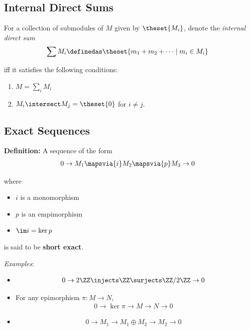 \hypertarget{internal-direct-sums}{%
\subsection{Internal Direct Sums}\label{internal-direct-sums}}

For a collection of submodules of \(M\) given by \(\theset{M_i}\),
denote the \emph{internal direct sum} \begin{align*}
\sum M_i \definedas \theset{m_1 + m_2 + \cdots \mid m_i \in M_i}
\end{align*}

iff it satisfies the following conditions:

\begin{enumerate}
\def\labelenumi{\arabic{enumi}.}
\item
  \(M = \sum_i M_i\)
\item
  \(M_i \intersect M_j = \theset{0}\) for \(i\neq j\).
\end{enumerate}

\hypertarget{exact-sequences}{%
\subsection{Exact Sequences}\label{exact-sequences}}

\textbf{Definition:} A sequence of the form
\begin{align*}
0 \to M_1 \mapsvia{i} M_2 \mapsvia{p} M_3 \to 0
\end{align*}

where

\begin{itemize}
\item
  \(i\) is a monomorphism
\item
  \(p\) is an empimorphism
\item
  \(\im i = \ker p\)
\end{itemize}

is said to be \textbf{short exact}.

\emph{Examples}:

\begin{itemize}
\item

  \begin{align*}
  0 \to 2\ZZ \injects \ZZ \surjects \ZZ/2\ZZ \to 0
  \end{align*}
\item
  For any epimorphism \(\pi: M\to N\),
  \begin{align*}
  0 \to \ker \pi \to M \to N \to 0
  \end{align*}
\item

  \begin{align*}
  0 \to M_1 \to M_1 \oplus M_2 \to M_2 \to 0
  \end{align*}
\end{itemize}

